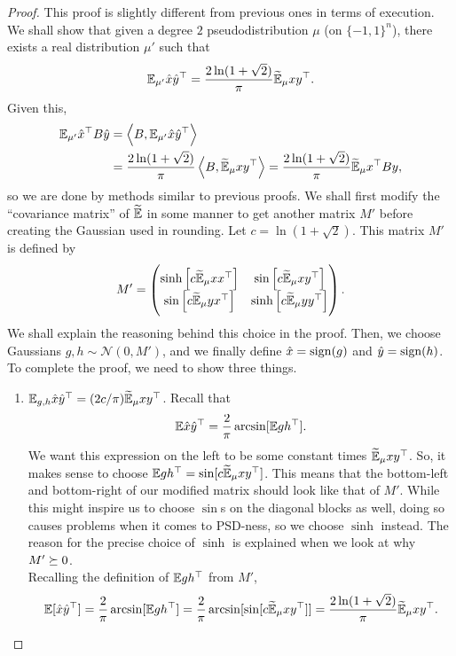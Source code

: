 	\begin{proof}
		This proof is slightly different from previous ones in terms of execution. We shall show that given a degree $2$ pseudodistribution $\mu$ (on $\{-1,1\}^n$), there exists a real distribution $\mu'$ such that
		\[ \mathbb{E}_{\mu'} \hat{x} \hat{y}^\top = \frac{2\ln(1+\sqrt{2})}{\pi} \widetilde{\mathbb{E}}_\mu x y^\top. \]
		Given this,
		\begin{align*}
			\mathbb{E}_{\mu'} \hat{x}^\top B \hat{y} &= \left\langle B , \mathbb{E}_{\mu'} \hat{x} \hat{y}^\top \right\rangle \\
				&= \frac{2\ln(1+\sqrt{2})}{\pi} \left\langle B , \widetilde{\mathbb{E}}_{\mu} xy^\top \right\rangle = \frac{2\ln(1+\sqrt{2})}{\pi} \widetilde{\mathbb{E}}_\mu x^\top B y,
		\end{align*}
		so we are done by methods similar to previous proofs.
		We shall first modify the ``covariance matrix'' of $\widetilde{\mathbb{E}}$ in some manner to get another matrix $M'$ before creating the Gaussian used in rounding. Let $c = \ln(1+\sqrt{2})$. This matrix $M'$ is defined by
		\[ M' = \begin{pmatrix} \sinh\left[ c \widetilde{\mathbb{E}}_\mu xx^\top \right] & \sin\left[ c \widetilde{\mathbb{E}}_\mu xy^\top \right] \\ \sin\left[ c \widetilde{\mathbb{E}}_\mu yx^\top \right] & \sinh\left[ c \widetilde{\mathbb{E}}_\mu yy^\top \right] \end{pmatrix}. \]
		We shall explain the reasoning behind this choice in the proof.
		Then, we choose Gaussians $g,h \sim \mathcal{N}(0,M')$, and we finally define $\hat{x} = \operatorname{sign}(g)$ and $\hat{y} = \operatorname{sign}(h)$. To complete the proof, we need to show three things.
		\begin{enumerate}[label=(\alph*)]
			\item $\mathbb{E}_{g,h} \hat{x} \hat{y}^\top = (2c/\pi) \widetilde{\mathbb{E}}_{\mu} xy^\top$. Recall that
			\[ \mathbb{E}\hat{x} \hat{y}^\top = \frac{2}{\pi} \arcsin[\mathbb{E} gh^\top].  \]
			We want this expression on the left to be some constant times $\widetilde{\mathbb{E}}_\mu xy^\top$. So, it makes sense to choose $\mathbb{E} gh^\top = \sin[c \widetilde{\mathbb{E}}_\mu xy^\top]$. This means that the bottom-left and bottom-right of our modified matrix should look like that of $M'$. While this might inspire us to choose $\sin$s on the diagonal blocks as well, doing so causes problems when it comes to PSD-ness, so we choose $\sinh$ instead. The reason for the precise choice of $\sinh$ is explained when we look at why $M' \succeq 0$.\\
			Recalling the definition of $\mathbb{E} gh^\top$ from $M'$,
			\[ \mathbb{E}[\hat{x} \hat{y}^\top] = \frac{2}{\pi} \arcsin[\mathbb{E} gh^\top] = \frac{2}{\pi} \arcsin[\sin[c \widetilde{\mathbb{E}}_\mu xy^\top]] = \frac{2\ln(1+\sqrt{2})}{\pi} \widetilde{\mathbb{E}}_\mu xy^\top. \]

\end{enumerate}
\end{proof}
